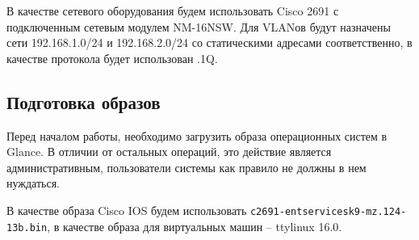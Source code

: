 В качестве сетевого оборудования будем использовать Cisco 2691 с подключенным сетевым модулем NM-16NSW.
Для VLANов будут назначены сети 192.168.1.0/24 и 192.168.2.0/24 со статическими адресами соответственно, в качестве
протокола будет использован .1Q. 

\subsection{Подготовка образов}

Перед началом работы, необходимо загрузить образа операционных систем в Glance. В отличии от остальных операций, это действие
является административным, пользователи системы как правило не должны в нем нуждаться. 

В качестве образа Cisco IOS будем 
использовать \verb`c2691-entservicesk9-mz.124-13b.bin`, в качестве образа для виртуальных машин -- ttylinux 16.0.

